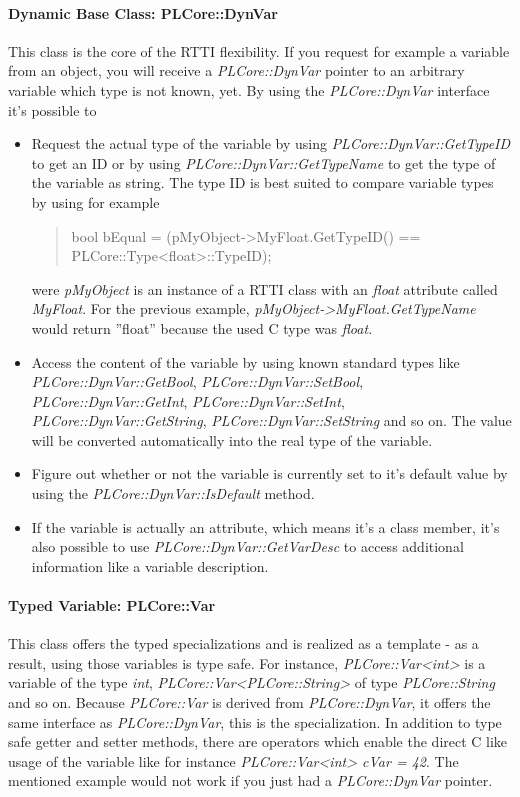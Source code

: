 \paragraph{Dynamic Base Class: PLCore::DynVar}
This class is the core of the RTTI flexibility. If you request for example a variable from an object, you will receive a \emph{PLCore::DynVar} pointer to an arbitrary variable which type is not known, yet. By using the \emph{PLCore::DynVar} interface it's possible to
\begin{itemize}
\item{Request the actual type of the variable by using \emph{PLCore::DynVar::GetTypeID} to get an ID or by using \emph{PLCore::DynVar::GetTypeName} to get the type of the variable as string. The type ID is best suited to compare variable types by using for example \begin{quote}bool bEqual = (pMyObject->MyFloat.GetTypeID() == PLCore::Type<float>::TypeID);\end{quote} were \emph{pMyObject} is an instance of a RTTI class with an \emph{float} attribute called \emph{MyFloat}. For the previous example, \emph{pMyObject->MyFloat.GetTypeName} would return ''float'' because the used C type was \emph{float}.}
\item{Access the content of the variable by using known standard types like \emph{PLCore::DynVar::GetBool}, \emph{PLCore::DynVar::SetBool}, \emph{PLCore::DynVar::GetInt}, \emph{PLCore::DynVar::SetInt}, \emph{PLCore::DynVar::GetString}, \emph{PLCore::DynVar::SetString} and so on. The value will be converted automatically into the real type of the variable.}
\item{Figure out whether or not the variable is currently set to it's default value by using the \emph{PLCore::DynVar::IsDefault} method.}
\item{If the variable is actually an attribute, which means it's a class member, it's also possible to use \emph{PLCore::DynVar::GetVarDesc} to access additional information like a variable description.}
\end{itemize}


\paragraph{Typed Variable: PLCore::Var}
This class offers the typed specializations and is realized as a template - as a result, using those variables is type safe. For instance, \emph{PLCore::Var<int>} is a variable of the type \emph{int}, \emph{PLCore::Var<PLCore::String>} of type \emph{PLCore::String} and so on. Because \emph{PLCore::Var} is derived from \emph{PLCore::DynVar}, it offers the same interface as \emph{PLCore::DynVar}, this is the specialization. In addition to type safe getter and setter methods, there are operators which enable the direct C like usage of the variable like for instance \emph{PLCore::Var<int> cVar = 42}. The mentioned example would not work if you just had a \emph{PLCore::DynVar} pointer.


